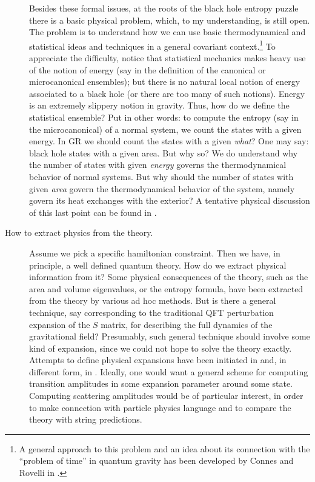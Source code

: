 \documentclass[12pt]{article}
\begin{document}
\begin{description}
Besides these formal issues, at the roots of the black hole 
entropy puzzle there is a basic physical problem, which, to my 
understanding, is still open.  The problem is to understand how we 
can use basic thermodynamical and statistical ideas and techniques 
in a general covariant context.\footnote{A general approach to
this problem and an idea about its connection with the  
``problem of time'' in quantum gravity has been developed by Connes 
and Rovelli in \cite{RovelliStat1,RovelliStat2,ConnesRovelli}.} To 
appreciate the difficulty, notice that statistical mechanics makes 
heavy use of the notion of energy (say in the definition of the 
canonical or microcanonical ensembles); but there is no natural 
local notion of energy associated to a black hole (or there are 
too many of such notions).  Energy is an extremely slippery notion 
in gravity.  Thus, how do we define the statistical ensemble?  Put 
in other words: to compute the entropy (say in the microcanonical) 
of a normal system, we count the states with a given energy.  In 
GR we should count the states with a given {\em what\/}?  One may 
say: black hole states with a given area.  But why so?  We do 
understand why the number of states with given {\em energy\/} 
governs the thermodynamical behavior of normal systems.  But why 
should the number of states with given {\em area\/} govern the 
thermodynamical behavior of the system, namely govern its heat 
exchanges with the exterior?  A tentative physical discussion of 
this last point can be found in \cite{RovelliAscona}.
 

\item[How to extract physics from the theory.]
	
Assume we pick a specific hamiltonian constraint.  Then we 
have, in principle, a well defined quantum theory.  How do 
we extract physical information from it?  Some physical 
consequences of the theory, such as the area and volume 
eigenvalues, or the entropy formula, have been extracted 
from the theory by various ad hoc methods.  But is there a 
general technique, say corresponding to the traditional QFT 
perturbation expansion of the $S$ matrix, for describing 
the full dynamics of the gravitational field?  Presumably, 
such general technique should involve some kind of 
expansion, since we could not hope to solve 
the theory exactly.  Attempts to define physical 
expansions have been initiated in \cite{Rovelli95b} 
and, in different form, in \cite{ReisenbergerRovelli}.  
Ideally, one would want a general scheme for computing transition 
amplitudes in some expansion parameter around some 
state. Computing scattering amplitudes would be of 
particular interest, in order to make connection with 
particle physics language and to compare the theory with 
string predictions. 


\end{description}
\end{document}
